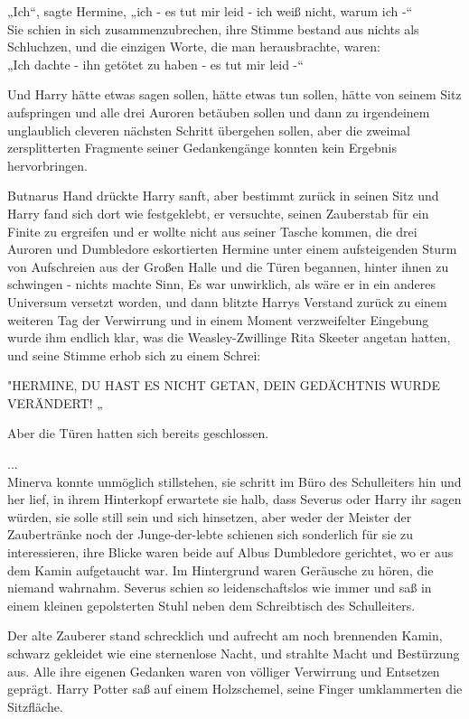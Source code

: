 {„Ich“, sagte Hermine, „ich - es tut mir leid - ich weiß nicht, warum ich -“\\ Sie schien in sich zusammenzubrechen, ihre Stimme bestand aus nichts als Schluchzen, und die einzigen Worte, die man herausbrachte, waren:\\ „Ich dachte - ihn getötet zu haben - es tut mir leid -“

Und Harry hätte etwas sagen sollen, hätte etwas tun sollen, hätte von seinem Sitz aufspringen und alle drei Auroren betäuben sollen und dann zu irgendeinem unglaublich cleveren nächsten Schritt übergehen sollen, aber die zweimal zersplitterten Fragmente seiner Gedankengänge konnten kein Ergebnis hervorbringen.

Butnarus Hand drückte Harry sanft, aber bestimmt zurück in seinen Sitz und Harry fand sich dort wie festgeklebt, er versuchte, seinen Zauberstab für ein Finite zu ergreifen und er wollte nicht aus seiner Tasche kommen, die drei Auroren und Dumbledore eskortierten Hermine unter einem aufsteigenden Sturm von Aufschreien aus der Großen Halle und die Türen begannen, hinter ihnen zu schwingen - nichts machte Sinn, Es war unwirklich, als wäre er in ein anderes Universum versetzt worden, und dann blitzte Harrys Verstand zurück zu einem weiteren Tag der Verwirrung und in einem Moment verzweifelter Eingebung wurde ihm endlich klar, was die Weasley-Zwillinge Rita Skeeter angetan hatten, und seine Stimme erhob sich zu einem Schrei:

"HERMINE, DU HAST ES NICHT GETAN, DEIN GEDÄCHTNIS WURDE VERÄNDERT! „

Aber die Türen hatten sich bereits geschlossen.

...\\ Minerva konnte unmöglich stillstehen, sie schritt im Büro des Schulleiters hin und her lief, in ihrem Hinterkopf erwartete sie halb, dass Severus oder Harry ihr sagen würden, sie solle still sein und sich hinsetzen, aber weder der Meister der Zaubertränke noch der Junge-der-lebte schienen sich sonderlich für sie zu interessieren, ihre Blicke waren beide auf Albus Dumbledore gerichtet, wo er aus dem Kamin aufgetaucht war. Im Hintergrund waren Geräusche zu hören, die niemand wahrnahm. Severus schien so leidenschaftslos wie immer und saß in einem kleinen gepolsterten Stuhl neben dem Schreibtisch des Schulleiters.

Der alte Zauberer stand schrecklich und aufrecht am noch brennenden Kamin, schwarz gekleidet wie eine sternenlose Nacht, und strahlte Macht und Bestürzung aus. Alle ihre eigenen Gedanken waren von völliger Verwirrung und Entsetzen geprägt. Harry Potter saß auf einem Holzschemel, seine Finger umklammerten die Sitzfläche.

}
